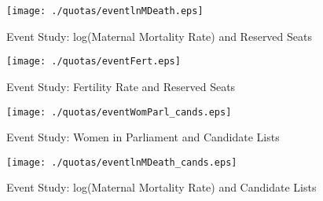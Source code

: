 \documentclass[10pt,letterpaper,subeqn]{beamer}
\begin{document}
\begin{frame}
  \begin{figure}[htpb!]
    \begin{center}
      \centering
      \caption{Event Study: log(Maternal Mortality Rate) and Reserved Seats}
      \texttt{[image: ./quotas/eventlnMDeath.eps]}
      \label{fig:RMMR}
    \end{center}
  \end{figure}
    \begin{figure}[htpb!]
    \begin{center}
      \centering
      \caption{Event Study: Fertility Rate and Reserved Seats}
      \texttt{[image: ./quotas/eventFert.eps]}
      \label{fig:RFert}
    \end{center}
  \end{figure}
\end{frame}

\begin{frame}
  \begin{figure}[htpb!]
    \begin{center}
      \centering
      \caption{Event Study: Women in Parliament and Candidate Lists}
      \texttt{[image: ./quotas/eventWomParl\_cands.eps]}
      \label{fig:RWP}
    \end{center}
  \end{figure}
\end{frame}

\begin{frame}
  \begin{figure}[htpb!]
    \begin{center}
      \centering
      \caption{Event Study: log(Maternal Mortality Rate) and Candidate Lists}
      \texttt{[image: ./quotas/eventlnMDeath\_cands.eps]}
      \label{fig:RMMR}
    \end{center}
  \end{figure}
\end{frame}
\end{document}
